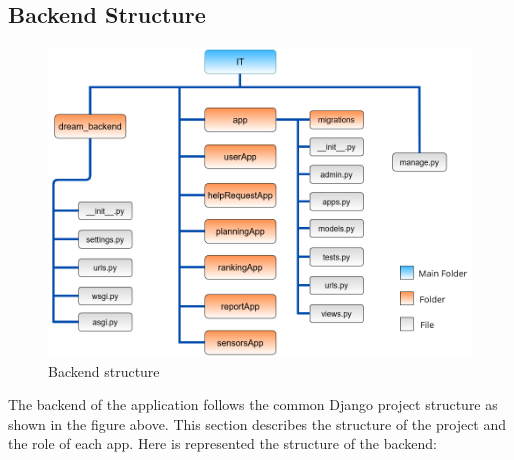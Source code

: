 \documentclass[table, 12pt]{article}
\begin{document}
\subsection{Backend Structure}
\begin{center}
    \begin{figure}[H]
        \includegraphics[scale=0.65, center]{assets/backend_structure.png}
        \caption{Backend structure}
        \label{fig: backend_structure}
    \end{figure}
\end{center}

The backend of the application follows the common Django project structure as shown in the figure above.
This section describes the structure of the project and the role of each app.\newline
Here is represented the structure of the backend:
\end{document}
